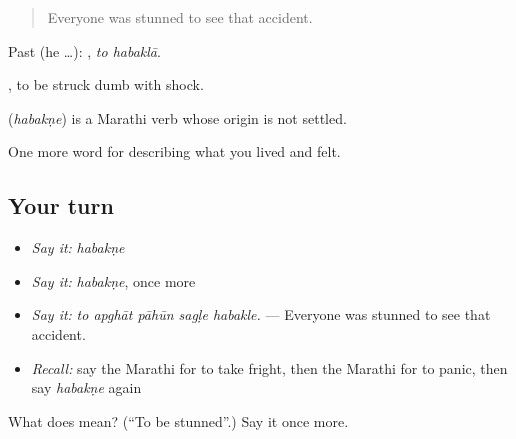 \begin{quote}
Everyone was stunned to see that accident.
\end{quote}

Past (he …):  , \emph{to habaklā}.

 , to be struck dumb with shock.

\begin{cousinweb}
\textbf{} (\emph{habakṇe}) is a Marathi verb whose origin is not settled.
\end{cousinweb}

\begin{grammarlens}[title={What you've built}]
One more word for describing what you lived and felt.
\end{grammarlens}

\subsection*{Your turn}
\begin{itemize}
\raggedright
  \item \emph{Say it:} \emph{habakṇe}
  \item \emph{Say it:} \emph{habakṇe}, once more
  \item \emph{Say it:} \emph{to apghāt pāhūn sagḷe habakle.} — Everyone was stunned to see that accident.
  \item \emph{Recall:} say the Marathi for to take fright, then the Marathi for to panic, then say \emph{habakṇe} again
\end{itemize}

\begin{tcolorbox}[breakable,colback=teal!4,colframe=teal!35!black,title={Before you move on}]
What does  mean? (\textquotedblleft{}To be stunned\textquotedblright{}.) Say it once more.
\end{tcolorbox}
